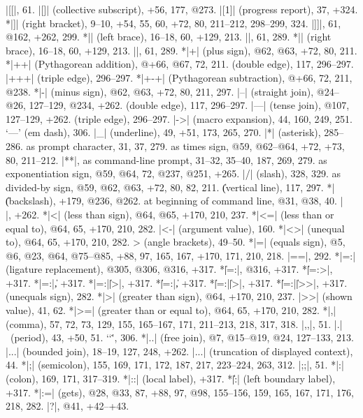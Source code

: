 |[[|, 61.
|[]| (collective subscript), +56, 177, @273.
|[1]| (progress report), 37, +324.
*|]| (right bracket), 9--10, +54, 55, 60, +72, 80, 211--212, 298--299, 324.
|]]|, 61, @162, +262, 299.
*|{| (left brace), 16--18, 60, +129, 213.
|{{|, 61, 289.
*|}| (right brace), 16--18, 60, +129, 213.
|}}|, 61, 289.
*|+| (plus sign), @62, @63, +72, 80, 211.
*|++| (Pythagorean addition), @+66, @67, 72, 211.
\sub (double edge), 117, 296--297.
|+++| (triple edge), 296--297.
*|+-+| (Pythagorean subtraction), @+66, 72, 211, @238.
*|-| (minus sign), @62, @63, +72, 80, 211, 297.
|--| (straight join), @24--@26, 127--129, @234, +262.
\sub (double edge), 117, 296--297.
|---| (tense join), @107, 127--129, +262.
\sub (triple edge), 296--297.
|->| (macro expansion), 44, 160, 249, 251.
`---' (em dash), 306.
|_| (underline), 49, +51, 173, 265, 270.
|*| (asterisk), 285--286.
\sub as prompt character, 31, 37, 279.
\sub {}as times sign, @59, @62--@64, +72, +73, 80, 211--212.
|**|, as command-line prompt, 31--32, 35--40, 187, 269, 279.
\sub as exponentiation sign, @59, @64, 72, @237, @251, +265.
|/| (slash), 328, 329.
\sub {}as divided-by sign, @59, @62, @63, +72, 80, 82, 211.
\| (vertical line), 117, 297.
*|\| (backslash), +179, @236, @262.
\sub at beginning of command line, @31, @38, 40.
|\\|, +262.
*|<| (less than sign), @64, @65, +170, 210, 237.
*|<=| (less than or equal to), @64, 65, +170, 210, 282.
|<-| (argument value), 160.
*|<>| (unequal to),  @64, 65, +170, 210, 282.
\<> (angle brackets), 49--50.
*|=| (equals sign), @5, @6, @23, @64, @75--@85, +88, 97, 165, 167, +170,
 171, 210, 218.
|==|, 292.
*|=:| (ligature replacement), @305, @306, @316, +317.
*\||=:|, @316, +317.
*\||=:>|, +317.
*|=:|\|, +317.
*|=:|\||>|, +317.
*\||=:|\|, +317.
*\||=:|\||>|, +317.
*\||=:|\||>>|, +317.
\leavevmode{\tt \rlap/=} (unequals sign), 282.
*|>| (greater than sign), @64, +170, 210, 237.
|>>| (shown value), 41, 62.
*|>=| (greater than or equal to), @64, 65, +170, 210, 282.
*|,| (comma), 57, 72, 73, 129, 155, 165--167, 171, 211--213, 218, 317, 318.
|,,|\thinspace, 51.
|.|~(period), 43, +50, 51.
`\char`\.', 306.
*|..| (free join), @7, @15--@19, @24, 127--133, 213.
|...| (bounded join), 18--19, 127, 248, +262.
|...| (truncation of displayed context), 44.
*|;| (semicolon), 155, 169, 171, 172, 187, 217, 223--224, 263, 312.
|;;|\thinspace, 51.
*|:| (colon), 169, 171, 317--319.
*|::| (local label), +317.
*\|\||:| (left boundary label), +317.
*|:=| (gets), @28, @33, 87, +88, 97, @98, 155--156, 159, 165, 167, 171,
 176, 218, 282.
|?|, @41, +42--+43.
